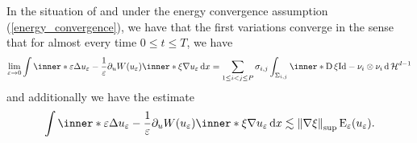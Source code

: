 \begin{proposition}
	\label{convergence_of_curvature_multiphase}
	In the situation of  and under the energy convergence assumption (\ref{energy_convergence}), we have that the first variations converge in the sense that for almost every time $ 0 \leq t \leq T $, we have
	\begin{equation*}
		\lim_{ \varepsilon \to 0 }
			\int
				\inner*{ 
					\varepsilon \Delta u_{ \varepsilon } - \frac{ 1 }{ 
					\varepsilon } \partial_{ u } W ( u_{ \varepsilon } ) 
				}
				{ \inner*{ \xi }{ \nabla u_{ \varepsilon } } }
			\dd{ x }
		=
		\sum_{ 1 \leq i < j \leq P }
			\sigma_{ i , j }
			\int_{ \Sigma_{ i , j } }
				\inner*{ \diff \xi }{ \mathrm{Id} - \nu_{ i } \otimes \nu_{ i } }
			\dd{ \hm^{ d - 1} }
	\end{equation*}
	and additionally we have the estimate
	\begin{equation}
		\label{pointwise_estimate_for_curvature}
		\int
		\inner*{ 
			\varepsilon \Delta u_{ \varepsilon } - \frac{ 1 }{ \varepsilon } 	
			\partial_{ u } W ( u_{ \varepsilon } ) 
		}
		{ \inner*{ \xi }{ \nabla u_{ \varepsilon } } }
		\dd{ x }
		\lesssim
		\norm{ \nabla \xi }_{ \sup }
		\energy_{ \varepsilon } ( u_{ \varepsilon } ).
	\end{equation}
\end{proposition}

